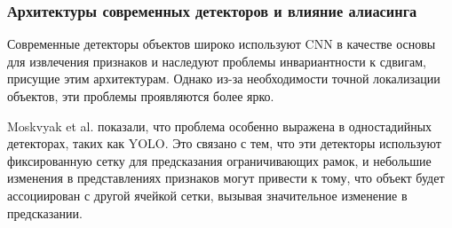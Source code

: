 \subsubsection{Архитектуры современных детекторов и влияние алиасинга}
\label{sec:detectors:architectures}

Современные детекторы объектов широко используют CNN в качестве основы для извлечения признаков и наследуют проблемы инвариантности к сдвигам, присущие этим архитектурам. Однако из-за необходимости точной локализации объектов, эти проблемы проявляются более ярко.

Moskvyak et al. \cite{Moskvyak2021} показали, что проблема особенно выражена в одностадийных детекторах, таких как YOLO. Это связано с тем, что эти детекторы используют фиксированную сетку для предсказания ограничивающих рамок, и небольшие изменения в представлениях признаков могут привести к тому, что объект будет ассоциирован с другой ячейкой сетки, вызывая значительное изменение в предсказании.

\newpage
